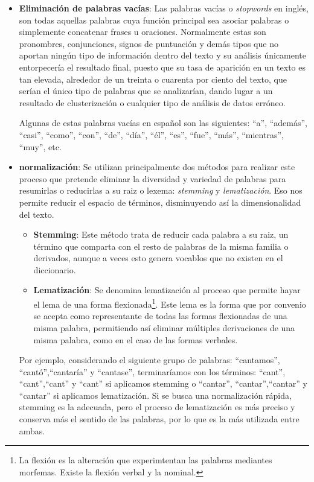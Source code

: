 \documentclass[10pt, a4paper]{article}
\begin{document}
\begin{itemize}
  \item \textbf{Eliminación de palabras vacías}: Las palabras vacías o \textit{stopwords} en inglés, son todas aquellas palabras cuya función principal sea asociar palabras o simplemente concatenar frases u oraciones. Normalmente estas son pronombres, conjunciones, signos de puntuación y demás tipos que no aportan ningún tipo de información dentro del texto y su análisis únicamente entorpecería el resultado final, puesto que su tasa de aparición en un texto es tan elevada, alrededor de un treinta o cuarenta por ciento del texto, que serían el único tipo de palabras que se analizarían, dando lugar a un resultado de clusterización o cualquier tipo de análisis de datos erróneo. 
  
  Algunas de estas palabras vacías en español son las siguientes: ``a'', ``además'', ``casi'', ``como'', ``con'', ``de'', ``día'', ``él'', ``es'', ``fue'', ``más'', ``mientras'', ``muy'', etc.
  
  \item \textbf{normalización}: Se utilizan principalmente dos métodos para realizar este proceso que pretende eliminar la diversidad y variedad de palabras para resumirlas o reducirlas a su raiz o lexema: \textit{stemming} y \textit{lematización}. Eso nos permite reducir el espacio de términos, disminuyendo así la dimensionalidad del texto.
  
  \begin{itemize}
    \item \textbf{Stemming}: Este método trata de reducir cada palabra a su raiz, un término que comparta con el resto de palabras de la misma familia o derivados, aunque a veces esto genera vocablos que no existen en el diccionario.
    
    \item \textbf{Lematización}: Se denomina lematización al proceso que permite hayar el lema de una forma flexionada\footnote{La flexión es la alteración que experimtentan las palabras mediantes morfemas. Existe la flexión verbal y la nominal.}. Este lema es la forma que por convenio se acepta como representante de todas las formas flexionadas de una misma palabra, permitiendo así eliminar múltiples derivaciones de una misma palabra, como en el caso de las formas verbales. \cite{lematizacion} 
  \end{itemize}
  
  Por ejemplo, considerando el siguiente grupo de palabras: ``cantamos'', ``cantó'',``cantaría'' y ``cantase'', terminaríamos con los términos: ``cant'', ``cant'',``cant'' y ``cant'' si aplicamos stemming o ``cantar'', ``cantar'',``cantar'' y ``cantar'' si aplicamos lematización. Si se busca una normalización rápida, stemming es la adecuada, pero el proceso de lematización es más preciso y conserva más el sentido de las palabras, por lo que es la más utilizada entre ambas.
  
\end{itemize}
\end{document}
